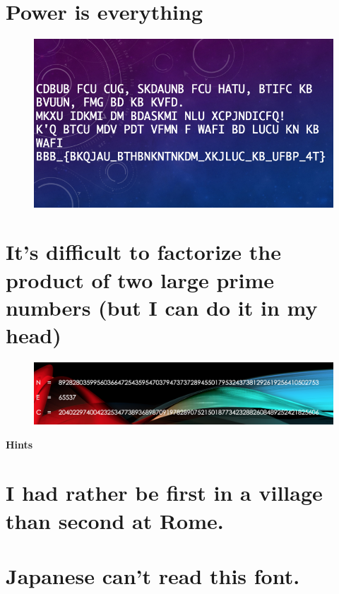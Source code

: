 \documentclass{jsarticle}
\begin{document}
\section{Power is everything}
\begin{figure}[H]
	\begin{center}
		\includegraphics[clip, width=15.9cm]{./Challenge4.png}
	\end{center}
\end{figure}

\section{It's difficult to factorize the product of two large prime numbers (but I can do it in my head)}
\begin{figure}[H]
	\begin{center}
		\includegraphics[clip, width=15.9cm]{./Challenge5.png}
	\end{center}
\end{figure}

\newpage

\textbf{Hints}
\setcounter{section}{0}

\section{I had rather be first in a village than second at Rome.}
\section{Japanese can't read this font.}
\end{document}
